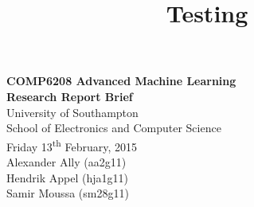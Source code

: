 \documentclass[11pt, a4paper, titlepage]{article}
\title{Testing}
\begin{document}
\begin{center}
{\Large \textbf{COMP6208 Advanced Machine Learning\\Research Report Brief}}\\
\vspace{0.7cm}
University of Southampton\\
School of Electronics and Computer Science\\
Friday 13\textsuperscript{th} February, 2015\\
\vspace{0.7cm}
Alexander Ally (aa2g11)\\
Hendrik Appel (hja1g11)\\
Samir Moussa (sm28g11)
\end{center}
\end{document}
